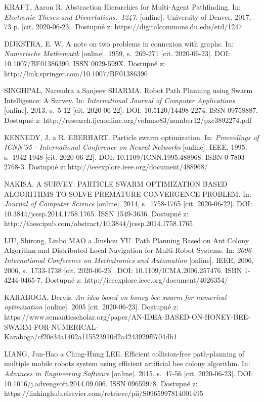 \begin{thebibliography}{99}
KRAFT, Aaron R. Abstraction Hierarchies for Multi-Agent Pathfinding. In: \textit{Electronic Theses and Dissertations.~1247.} [online]. University of Denver, 2017, 73 p. [cit. 2020-06-23]. Dostupné z: https://digitalcommons.du.edu/etd/1247

DIJKSTRA, E. W. A note on two problems in connexion with graphs. In: \textit{Numerische Mathematik} [online]. 1959, s.~269-271 [cit. 2020-06-23]. DOI: 10.1007/BF01386390. ISSN 0029-599X. Dostupné z: http://link.springer.com/10.1007/BF01386390

SINGHPAL, Narendra a Sanjeev SHARMA. Robot Path Planning using Swarm Intelligence: A Survey. In: \textit{International Journal of Computer Applications} [online]. 2013, s.~5-12 [cit. 2020-06-22]. DOI: 10.5120/14498-2274. ISSN 09758887. Dostupné z: http://research.ijcaonline.org/volume83/number12/pxc3892274.pdf

KENNEDY, J. a R. EBERHART. Particle swarm optimization. In: \textit{Proceedings of ICNN'95 - International Conference on Neural Networks} [online]. IEEE, 1995, s.~1942-1948 [cit. 2020-06-22]. DOI: 10.1109/ICNN.1995.488968. ISBN 0-7803-2768-3. Dostupné z: http://ieeexplore.ieee.org/document/488968/

NAKISA. A SURVEY: PARTICLE SWARM OPTIMIZATION BASED ALGORITHMS TO SOLVE PREMATURE CONVERGENCE PROBLEM. In: \textit{Journal of Computer Science} [online]. 2014, s.~1758-1765 [cit. 2020-06-22]. DOI: 10.3844/jcssp.2014.1758.1765. ISSN 1549-3636. Dostupné z: http://thescipub.com/abstract/10.3844/jcssp.2014.1758.1765

LIU, Shirong, Linbo MAO a Jinshou YU. Path Planning Based on Ant Colony Algorithm and Distributed Local Navigation for Multi-Robot Systems. In: \textit{2006 International Conference on Mechatronics and Automation} [online]. IEEE, 2006, 2006, s.~1733-1738 [cit. 2020-06-23]. DOI: 10.1109/ICMA.2006.257476. ISBN 1-4244-0465-7. Dostupné z: http://ieeexplore.ieee.org/document/4026354/

KARABOGA, Dervis. \textit{An idea based on honey bee swarm for numerical optimization} [online]. 2005 [cit. 2020-06-23]. Dostupné z: https://www.semanticscholar.org/paper/AN-IDEA-BASED-ON-HONEY-BEE-SWARM-FOR-NUMERICAL-Karaboga/cf20e34a1402a115523910d2a4243929f6704db1

LIANG, Jun-Hao a Ching-Hung LEE. Efficient collision-free path-planning of multiple mobile robots system using efficient artificial bee colony algorithm. In: \textit{Advances in Engineering Software} [online]. 2015, s.~47-56 [cit. 2020-06-23]. DOI: 10.1016/j.advengsoft.2014.09.006. ISSN 09659978. Dostupné z: https://linkinghub.elsevier.com/retrieve/pii/S0965997814001495


\end{thebibliography}
